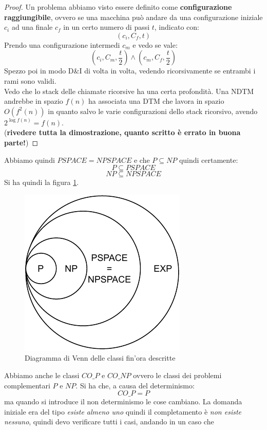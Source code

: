 \begin{proof}
  Un problema abbiamo visto essere definito come \textbf{configurazione
    raggiungibile}, ovvero se una macchina può andare da una configurazione
  iniziale $c_i$ ad una finale $c_f$ in un certo numero di passi $t$, indicato
  con:
  \[(c_i,C_f,t)\]
  Prendo una
  configurazione intermedi $c_m$ e vedo se vale:
  \[\left(c_i,C_m,\frac{t}{2}\right)\land \left(c_m,C_f,\frac{t}{2}\right)\]
  Spezzo poi in modo D\&I di volta in volta, vedendo ricorsivamente se entrambi
  i rami sono validi.\\
  Vedo che lo stack delle chiamate ricorsive ha una certa profondità. Una NDTM
  andrebbe in spazio $f(n)$ ha associata una DTM che lavora in spazio
  $O(f^2(n))$ in quanto salvo le varie configurazioni dello stack ricorsivo,
  avendo $2^{\log f(n)}=f(n)$.\\
  (\textbf{rivedere tutta la dimostrazione, quanto scritto è errato in buona
    parte!})
  
\end{proof}
Abbiamo quindi $PSPACE=NPSPACE$ e che $P\subseteq NP$ quindi certamente:
\[P\subseteq PSPACE\]
\[NP\subseteq NPSPACE\]
Si ha quindi la figura \ref{fig:cla}.
\begin{figure}
  \centering
  \includegraphics[scale = 0.9]{img/cla.pdf}
  \caption{Diagramma di Venn delle classi fin'ora descritte}
  \label{fig:cla}
\end{figure}
Abbiamo anche le classi $CO\_P$ e $CO\_NP$ ovvero le classi dei problemi
complementari $P$ e $NP$. Si ha che, a causa del determinismo:
\[CO\_P=P\]
ma quando si introduce il non determinismo le cose cambiano. La domanda iniziale
era del tipo \textit{esiste almeno uno} quindi il completamento è \textit{non
  esiste nessuno}, quindi devo verificare tutti i casi, andando in un caso che
